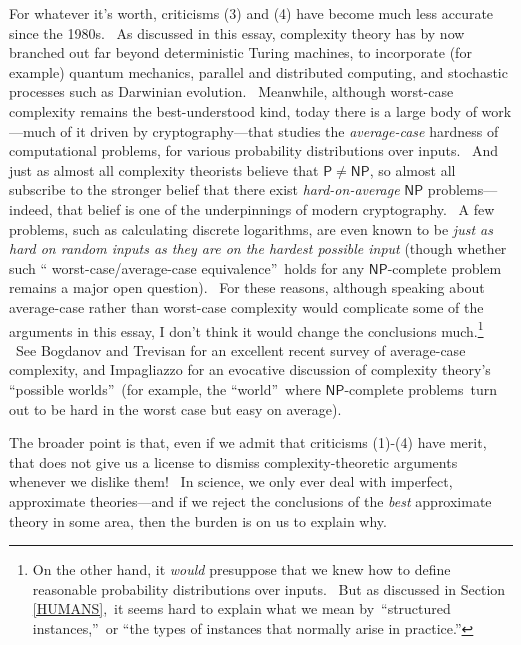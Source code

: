\documentclass[12pt,onecolumn]{article}%
\begin{document}
For whatever it's worth, criticisms (3) and (4) have become much less accurate
since the 1980s. \ As discussed in this essay, complexity theory has by now
branched out far beyond deterministic Turing machines, to incorporate (for
example) quantum mechanics, parallel and distributed computing, and stochastic
processes such as Darwinian evolution. \ Meanwhile, although worst-case
complexity remains the best-understood kind, today there is a large body of
work---much of it driven by cryptography---that studies the
\textit{average-case} hardness of computational problems, for various
probability distributions over inputs. \ And just as almost all complexity
theorists believe that $\mathsf{P}\neq\mathsf{NP}$, so almost all subscribe to
the stronger belief that there exist \textit{hard-on-average} $\mathsf{NP}$
problems---indeed, that belief is one of the underpinnings of modern
cryptography. \ A few problems, such as calculating discrete logarithms, are
even known to be \textit{just as hard on random inputs as they are on the
hardest possible input} (though whether such \textquotedblleft
worst-case/average-case equivalence\textquotedblright\ holds for any
$\mathsf{NP}$-complete problem remains a major open question). \ For these
reasons, although speaking about average-case rather than worst-case
complexity would complicate some of the arguments in this essay, I don't think
it would change the conclusions much.\footnote{On the other hand, it
\textit{would} presuppose that we knew how to define reasonable probability
distributions over inputs. \ But as discussed in Section \ref{HUMANS},\ it
seems hard to explain what we mean by\ \textquotedblleft structured
instances,\textquotedblright\ or \textquotedblleft the types of instances that
normally arise in practice.\textquotedblright} \ See Bogdanov and Trevisan
\cite{bt} for an excellent recent survey of average-case complexity, and
Impagliazzo \cite{impagliazzo} for an evocative discussion of complexity
theory's \textquotedblleft possible worlds\textquotedblright\ (for example,
the \textquotedblleft world\textquotedblright\ where $\mathsf{NP}$-complete
problems\ turn out to be hard in the worst case but easy on average).

The broader point is that, even if we admit that criticisms (1)-(4) have
merit, that does not give us a license to dismiss complexity-theoretic
arguments whenever we dislike them! \ In science, we only ever deal with
imperfect, approximate theories---and if we reject the conclusions of the
\textit{best} approximate theory in some area, then the burden is on us to
explain why.
\end{document}
